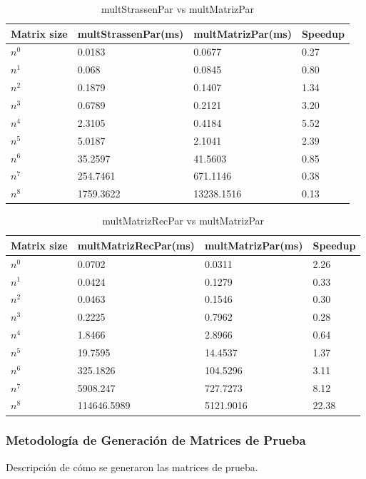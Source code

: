 \documentclass[12pt, a4paper]{article}
\begin{document}
\begin{table}[h]
    \centering
    \begin{tabular}{ | m{2cm} | m{4cm} | m{4cm} | m{3cm} | }
    \hline
    Matrix size & multStrassenPar(ms) & multMatrizPar(ms) & Speedup \\ 
    \hline
    $n^0$ & 0.0183 & 0.0677 & 0.27 \\
    $n^1$ & 0.068 & 0.0845 & 0.80 \\
    $n^2$ & 0.1879 & 0.1407 & 1.34 \\
    $n^3$ & 0.6789 & 0.2121 & 3.20 \\
    $n^4$ & 2.3105 & 0.4184 & 5.52 \\
    $n^5$ & 5.0187 & 2.1041 & 2.39 \\
    $n^6$ & 35.2597 & 41.5603 & 0.85 \\
    $n^7$ & 254.7461 & 671.1146 & 0.38 \\
    $n^8$ & 1759.3622 & 13238.1516 & 0.13 \\
    \hline
    \end{tabular}
    \caption{multStrassenPar vs multMatrizPar}
    \label{table:strassen_par_matrix_par_comparison}
\end{table}

\begin{table}[h]
    \centering
    \begin{tabular}{ | m{2cm} | m{4cm} | m{4cm} | m{3cm} | }
    \hline
    Matrix size & multMatrizRecPar(ms) & multMatrizPar(ms) & Speedup \\ 
    \hline
    $n^0$ & 0.0702 & 0.0311 & 2.26 \\
    $n^1$ & 0.0424 & 0.1279 & 0.33 \\
    $n^2$ & 0.0463 & 0.1546 & 0.30 \\
    $n^3$ & 0.2225 & 0.7962 & 0.28 \\
    $n^4$ & 1.8466 & 2.8966 & 0.64 \\
    $n^5$ & 19.7595 & 14.4537 & 1.37 \\
    $n^6$ & 325.1826 & 104.5296 & 3.11 \\
    $n^7$ & 5908.247 & 727.7273 & 8.12 \\
    $n^8$ & 114646.5989 & 5121.9016 & 22.38 \\
    \hline
    \end{tabular}
    \caption{multMatrizRecPar vs multMatrizPar}
    \label{table:rec_par_matrix_par_comparison}
\end{table}

\subsubsection{Metodología de Generación de Matrices de Prueba}
Descripción de cómo se generaron las matrices de prueba.
\end{document}
